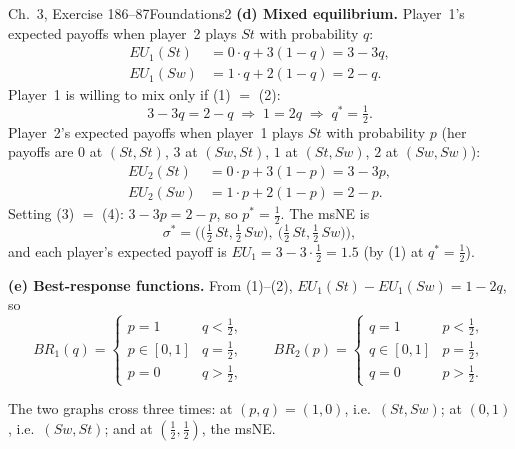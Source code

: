 \begin{exsol}{\MG{} Ch.~3, Exercise 1}{86--87}{Foundations}{2}
\textbf{(d) Mixed equilibrium.} Player~1's expected payoffs when player~2 plays $St$ with
probability $q$:
\begin{align*}
  EU_1(St) &= 0\cdot q + 3(1-q) = 3 - 3q, \tag{1}\\
  EU_1(Sw) &= 1\cdot q + 2(1-q) = 2 - q. \tag{2}
\end{align*}
Player~1 is willing to mix only if (1) $=$ (2):
\[
  3 - 3q = 2 - q \;\Longrightarrow\; 1 = 2q \;\Longrightarrow\; q^* = \tfrac12 .
\]
Player~2's expected payoffs when player~1 plays $St$ with probability $p$ (her payoffs are
$0$ at $(St,St)$, $3$ at $(Sw,St)$, $1$ at $(St,Sw)$, $2$ at $(Sw,Sw)$):
\begin{align*}
  EU_2(St) &= 0\cdot p + 3(1-p) = 3 - 3p, \tag{3}\\
  EU_2(Sw) &= 1\cdot p + 2(1-p) = 2 - p. \tag{4}
\end{align*}
Setting (3) $=$ (4): $3 - 3p = 2 - p$, so $p^* = \tfrac12$. The msNE is
\[
  \sigma^* = \Big(\big(\tfrac12\,St, \tfrac12\,Sw\big),\ \big(\tfrac12\,St, \tfrac12\,Sw\big)\Big),
\]
and each player's expected payoff is $EU_1 = 3 - 3\cdot\tfrac12 = 1.5$ (by (1) at $q^* = \tfrac12$).

\textbf{(e) Best-response functions.} From (1)--(2), $EU_1(St) - EU_1(Sw) = 1 - 2q$, so
\[
  BR_1(q) = \begin{cases} p = 1 & q < \tfrac12,\\ p \in [0,1] & q = \tfrac12,\\ p = 0 & q > \tfrac12,\end{cases}
  \qquad
  BR_2(p) = \begin{cases} q = 1 & p < \tfrac12,\\ q \in [0,1] & p = \tfrac12,\\ q = 0 & p > \tfrac12.\end{cases}
\]
\begin{center}
\end{center}
The two graphs cross three times: at $(p,q) = (1,0)$, i.e.\ $(St,Sw)$; at $(0,1)$, i.e.\
$(Sw,St)$; and at $(\tfrac12,\tfrac12)$, the msNE.


\end{exsol}
